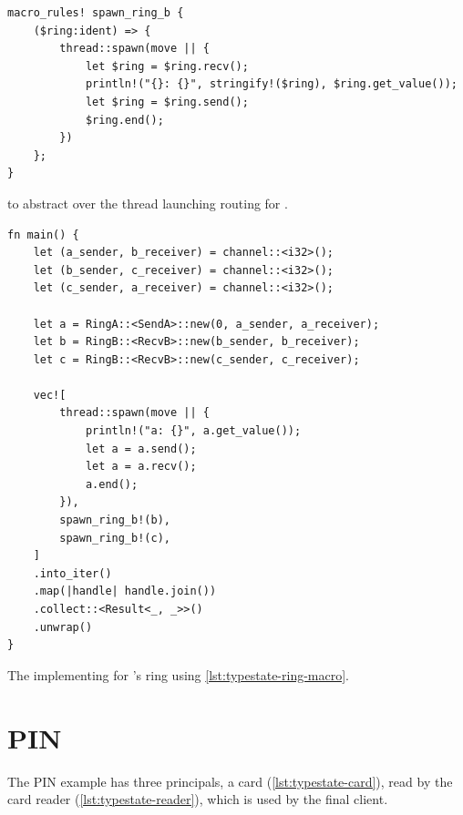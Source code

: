 \begin{listing}
    \begin{verbatim}
macro_rules! spawn_ring_b {
    ($ring:ident) => {
        thread::spawn(move || {
            let $ring = $ring.recv();
            println!("{}: {}", stringify!($ring), $ring.get_value());
            let $ring = $ring.send();
            $ring.end();
        })
    };
}
    \end{verbatim}
    \caption{ to abstract over the thread launching routing for .}
    \label{lst:typestate-ring-macro}
\end{listing}

\begin{listing}
    \begin{verbatim}
fn main() {
    let (a_sender, b_receiver) = channel::<i32>();
    let (b_sender, c_receiver) = channel::<i32>();
    let (c_sender, a_receiver) = channel::<i32>();

    let a = RingA::<SendA>::new(0, a_sender, a_receiver);
    let b = RingB::<RecvB>::new(b_sender, b_receiver);
    let c = RingB::<RecvB>::new(c_sender, c_receiver);

    vec![
        thread::spawn(move || {
            println!("a: {}", a.get_value());
            let a = a.send();
            let a = a.recv();
            a.end();
        }),
        spawn_ring_b!(b),
        spawn_ring_b!(c),
    ]
    .into_iter()
    .map(|handle| handle.join())
    .collect::<Result<_, _>>()
    .unwrap()
}
    \end{verbatim}
    \caption{The  implementing for 's ring using \autoref{lst:typestate-ring-macro}.}
    \label{lst:typestate-ring-main-macro}
\end{listing}

\section{PIN}\label{sec:case-study:pin}

The PIN example has three principals, a card (\autoref{lst:typestate-card}),
read by the card reader (\autoref{lst:typestate-reader}), which is used by the final client.

